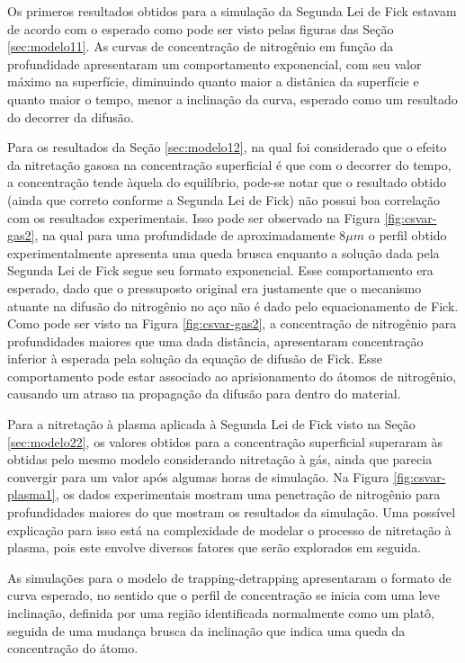 Os primeros resultados obtidos para a simulação da Segunda Lei de Fick estavam de acordo com o esperado como pode ser visto pelas figuras das Seção \ref{sec:modelo11}. As curvas de concentração de nitrogênio em função da profundidade apresentaram um comportamento exponencial, com seu valor máximo na superfície, diminuindo quanto maior a distânica da superfície e quanto maior o tempo, menor a inclinação da curva, esperado como um resultado do decorrer da difusão.

Para os resultados da Seção \ref{sec:modelo12}, na qual foi considerado que o efeito da nitretação gasosa na concentração superficial é que com o decorrer do tempo, a concentração tende àquela do equilíbrio, pode-se notar que o resultado obtido (ainda que correto conforme a Segunda Lei de Fick) não possui boa correlação com os resultados experimentais. Isso pode ser observado na Figura \ref{fig:csvar-gas2}, na qual para uma profundidade de aproximadamente 8$\mu m$ o perfil obtido experimentalmente apresenta uma queda brusca enquanto a solução dada pela Segunda Lei de Fick segue seu formato exponencial. Esse comportamento era esperado, dado que o pressuposto original era justamente que o mecanismo atuante na difusão do nitrogênio no aço não é dado pelo equacionamento de Fick. Como pode ser visto na Figura \ref{fig:csvar-gas2}, a concentração de nitrogênio para profundidades maiores que uma dada distância, apresentaram concentração inferior à esperada pela solução da equação de difusão de Fick. Esse comportamento pode estar associado ao aprisionamento do átomos de nitrogênio, causando um atraso na propagação da difusão para dentro do material.

Para a nitretação à plasma aplicada à Segunda Lei de Fick visto na Seção \ref{sec:modelo22}, os valores obtidos para a concentração superficial superaram às obtidas pelo mesmo modelo considerando nitretação à gás, ainda que parecia convergir para um valor após algumas horas de simulação. Na Figura \ref{fig:csvar-plasma1}, os dados experimentais mostram uma penetração de nitrogênio para profundidades maiores do que mostram os resultados da simulação. Uma possível explicação para isso está na complexidade de modelar o processo de nitretação à plasma, pois este envolve diversos fatores que serão  explorados em seguida.


As simulações para o modelo de trapping-detrapping apresentaram o formato de curva esperado, no sentido que o perfil de concentração se inicia com uma leve inclinação, definida por uma região identificada normalmente como um platô, seguida de uma mudança brusca da inclinação que indica uma queda da concentração do átomo.

